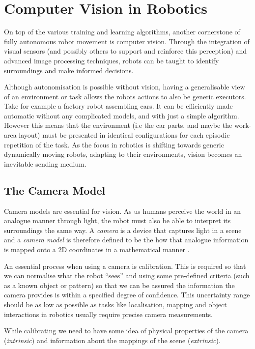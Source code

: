 \section{Computer Vision in Robotics}
On top of the various training and learning algorithms, another cornerstone of fully autonomous robot movement is computer vision. Through the integration of visual sensors (and possibly others to support and reinforce this perception) and advanced image processing techniques, robots can be taught to identify surroundings and make informed decisions. 

Although autonomisation is possible without vision, having a generalisable view of an environment or task allows the robots actions to also be generic executors. Take for example a factory robot assembling cars. It can be efficiently made automatic without any complicated models, and with just a simple algorithm. However this means that the environment (i.e the car parts, and maybe the work-area layout) must be presented in identical configurations for each episodic repetition of the task.
As the focus in robotics is shifting towards generic dynamically moving robots, adapting to their environments, vision becomes an inevitable sending medium.

\subsection{The Camera Model}
Camera models are essential for vision. As us humans perceive the world in an analogue manner through light, the robot must also be able to interpret its surroundings the same way. A \emph{camera} is a device that captures light in a scene and a \emph{camera model} is therefore defined to be the how that analogue information is mapped onto a 2D coordinates in a mathematical manner \cite{zhang2021cameramodels}. 

An essential process when using a camera is calibration. This is required so that we can normalise what the robot ``sees'' and using some pre-defined criteria (such as a known object or pattern) so that we can be assured the information the camera provides is within a specified degree of confidence. This uncertainty range should be as low as possible as tasks like localisation, mapping and object interactions in robotics usually require precise camera measurements.

While calibrating we need to have some idea of physical properties of the camera (\emph{intrinsic}) and information about the mappings of the scene (\emph{extrinsic}).

